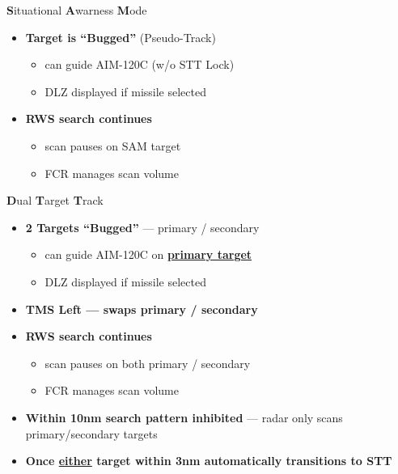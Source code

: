 \begin{tcoloritemize}
    \textbf{S}ituational \textbf{A}warness \textbf{M}ode

    \begin{itemize}
        \item \textbf{Target is ``Bugged''} (Pseudo-Track)
        \begin{itemize}
            \item can guide AIM-120C (w/o STT Lock)
            \item DLZ displayed if missile selected
        \end{itemize}
        \item \textbf{RWS search  continues}
        \begin{itemize}
            \item scan pauses on SAM target
            \item FCR manages scan volume
        \end{itemize}
    \end{itemize}
    \textbf{D}ual \textbf{T}arget \textbf{T}rack

    \begin{itemize}
        \item \textbf{2 Targets ``Bugged''} --- primary / secondary
        \begin{itemize}
            \item can guide AIM-120C on \textbf{\underline{primary target}}
            \item DLZ displayed if missile selected
        \end{itemize}
        \item \textbf{TMS Left --- swaps primary / secondary}
        \item \textbf{RWS search  continues}
        \begin{itemize}
            \item scan pauses on both primary / secondary
            \item FCR manages scan volume
        \end{itemize}
        \item \textbf{Within 10nm search pattern inhibited} --- radar only scans primary/secondary targets
        \item \textbf{Once \underline{either} target within 3nm automatically transitions to STT}
    \end{itemize}
    \blueitem[Spotlight]
        

\end{tcoloritemize}
